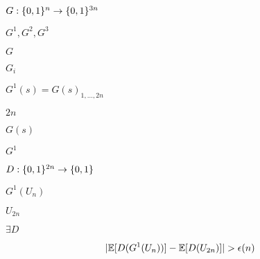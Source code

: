\documentclass[10pt]{book}
\begin{document}
\begin{mdSnippets}
\begin{mdInlineSnippet}[c5b1164fd9a7c69c4ebae3970e52c7ba]
$G:\{0,1\}^n\rightarrow\{0,1\}^{3n}$\end{mdInlineSnippet}%
\begin{mdInlineSnippet}%
$G^1,G^2,G^3$\end{mdInlineSnippet}%
\begin{mdInlineSnippet}[dfcf28d0734569a6a693bc8194de62bf]%
$G$\end{mdInlineSnippet}%
\begin{mdInlineSnippet}[e8153e65e22df0b3d23d1614471fd606]%
$G_i$\end{mdInlineSnippet}%
\begin{mdInlineSnippet}[0965267ca8da3b268b718d24dc332771]%
$G^1(s)=G(s)_{1,\ldots,2n}$\end{mdInlineSnippet}%
\begin{mdInlineSnippet}[21e2c0c0472b331622877accbe29b91b]%
$2n$\end{mdInlineSnippet}%
\begin{mdInlineSnippet}%
$G(s)$\end{mdInlineSnippet}%
\begin{mdInlineSnippet}%
$G^1$\end{mdInlineSnippet}%
\begin{mdInlineSnippet}[d74cb8b781f473decb3c52cd0c132b6c]%
$D: \{0,1\}^{2n} \to \{0,1\}$\end{mdInlineSnippet}%
\begin{mdInlineSnippet}%
$G^1(U_n)$\end{mdInlineSnippet}%
\begin{mdInlineSnippet}[f4d9591b1826b32bf817bf09af91b3ce]%
$U_{2n}$\end{mdInlineSnippet}%
\begin{mdInlineSnippet}[7b842d80c8aa4f431480e96d19038c7e]%
$\exists D$\end{mdInlineSnippet}%
\begin{mdDisplaySnippet}[4030866aeeec7a43c5cc0623f6db0b65]%
\[%
|\E[D(G^1(U_n))] - \E[D(U_{2n})]| > \epsilon(n)
\]%
\end{mdDisplaySnippet}%
\begin{mdInlineSnippet}[6d0c1b4d1364086cf8ee344445ebe2b4]%

\end{mdInlineSnippet}
\end{mdSnippets}
\end{document}
